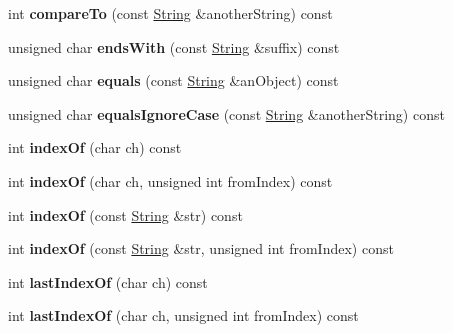 \begin{DoxyCompactItemize}
\item 
int {\bfseries compare\+To} (const \hyperlink{class_string}{String} \&another\+String) const \hypertarget{class_string_a1ed648fc6f54ab9e99fae08991675c77}{}\label{class_string_a1ed648fc6f54ab9e99fae08991675c77}

\item 
unsigned char {\bfseries ends\+With} (const \hyperlink{class_string}{String} \&suffix) const \hypertarget{class_string_a4f2b8d633c6f91309ebd315199a2d2b8}{}\label{class_string_a4f2b8d633c6f91309ebd315199a2d2b8}

\item 
unsigned char {\bfseries equals} (const \hyperlink{class_string}{String} \&an\+Object) const \hypertarget{class_string_a0f25dc8c00c27db4eb0deb713cbf5152}{}\label{class_string_a0f25dc8c00c27db4eb0deb713cbf5152}

\item 
unsigned char {\bfseries equals\+Ignore\+Case} (const \hyperlink{class_string}{String} \&another\+String) const \hypertarget{class_string_ae2cd256105577f22724d1eaff0431aaa}{}\label{class_string_ae2cd256105577f22724d1eaff0431aaa}

\item 
int {\bfseries index\+Of} (char ch) const \hypertarget{class_string_a798dc000292a549eca982a3a5e2de54a}{}\label{class_string_a798dc000292a549eca982a3a5e2de54a}

\item 
int {\bfseries index\+Of} (char ch, unsigned int from\+Index) const \hypertarget{class_string_a3cce8cd1ed439561aa25df6c546045d5}{}\label{class_string_a3cce8cd1ed439561aa25df6c546045d5}

\item 
int {\bfseries index\+Of} (const \hyperlink{class_string}{String} \&str) const \hypertarget{class_string_ae1ceec091fbce68e360c1e0717d50f28}{}\label{class_string_ae1ceec091fbce68e360c1e0717d50f28}

\item 
int {\bfseries index\+Of} (const \hyperlink{class_string}{String} \&str, unsigned int from\+Index) const \hypertarget{class_string_a97998ed753b0445123cc17449adb6e9a}{}\label{class_string_a97998ed753b0445123cc17449adb6e9a}

\item 
int {\bfseries last\+Index\+Of} (char ch) const \hypertarget{class_string_ae3dbedf8dc518d947c91f484b6d78a6f}{}\label{class_string_ae3dbedf8dc518d947c91f484b6d78a6f}

\item 
int {\bfseries last\+Index\+Of} (char ch, unsigned int from\+Index) const \hypertarget{class_string_a2d7b15343faa3c6048ff621e925fa156}{}\label{class_string_a2d7b15343faa3c6048ff621e925fa156}


\end{DoxyCompactItemize}
